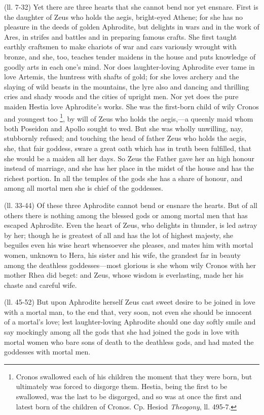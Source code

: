 (ll. 7-32) Yet there are three hearts that she cannot bend nor yet ensnare.
First is the daughter of Zeus who holds the aegis, bright-eyed Athene; for she
has no pleasure in the deeds of golden Aphrodite, but delights in wars and in
the work of Ares, in strifes and battles and in preparing famous crafts. She
first taught earthly craftsmen to make chariots of war and cars variously
wrought with bronze, and she, too, teaches tender maidens in the house and puts
knowledge of goodly arts in each one’s mind. Nor does laughter-loving
Aphrodite ever tame in love Artemis, the huntress with shafts of gold; for she
loves archery and the slaying of wild beasts in the mountains, the lyre also
and dancing and thrilling cries and shady woods and the cities of upright men.
Nor yet does the pure maiden Hestia love Aphrodite’s works. She was the
first-born child of wily Cronos and youngest too \footnote{Cronos swallowed each of
his children the moment that they were born, but ultimately was forced to
disgorge them. Hestia, being the first to be swallowed, was the last to be
disgorged, and so was at once the first and latest born of the children of
Cronos. Cp. Hesiod \emph{Theogony}, ll. 495-7.}, by will
of Zeus who holds the aegis,—a queenly maid whom both Poseidon and Apollo
sought to wed. But she was wholly unwilling, nay, stubbornly refused; and
touching the head of father Zeus who holds the aegis, she, that fair goddess,
sware a great oath which has in truth been fulfilled, that she would be a
maiden all her days. So Zeus the Father gave her an high honour instead of
marriage, and she has her place in the midst of the house and has the richest
portion. In all the temples of the gods she has a share of honour, and among
all mortal men she is chief of the goddesses.

(ll. 33-44) Of these three Aphrodite cannot bend or ensnare the hearts. But of
all others there is nothing among the blessed gods or among mortal men that has
escaped Aphrodite. Even the heart of Zeus, who delights in thunder, is led
astray by her; though he is greatest of all and has the lot of highest majesty,
she beguiles even his wise heart whensoever she pleases, and mates him with
mortal women, unknown to Hera, his sister and his wife, the grandest far in
beauty among the deathless goddesses—most glorious is she whom wily
Cronos with her mother Rhea did beget: and Zeus, whose wisdom is everlasting,
made her his chaste and careful wife.

(ll. 45-52) But upon Aphrodite herself Zeus cast sweet desire to be joined in
love with a mortal man, to the end that, very soon, not even she should be
innocent of a mortal’s love; lest laughter-loving Aphrodite should one
day softly smile and say mockingly among all the gods that she had joined the
gods in love with mortal women who bare sons of death to the deathless gods,
and had mated the goddesses with mortal men.

